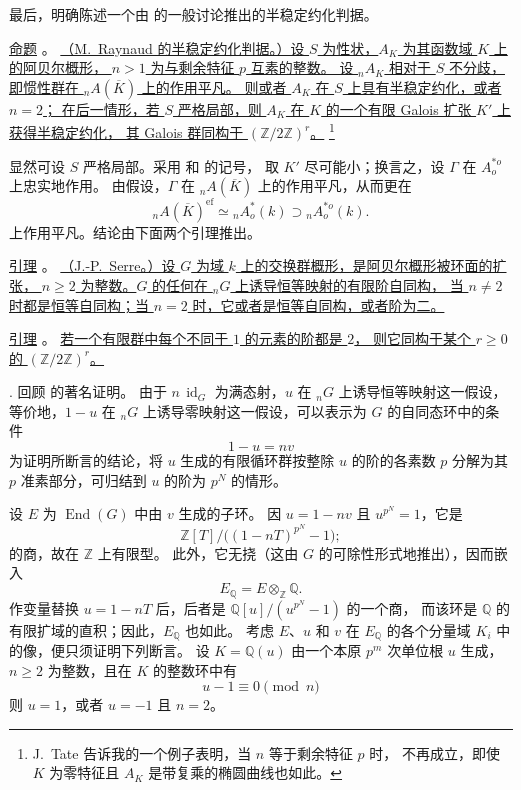 最后，明确陈述一个由  的一般讨论推出的半稳定约化判据。

\medskip
\noindent
\underline{命题} 。
\underline{（M.\ Raynaud 的半稳定约化判据。）设 $S$ 为性状，$A_K$ 为其函数域 $K$ 上的阿贝尔概形，
$n>1$ 为与剩余特征 $p$ 互素的整数。
设 ${}_nA_K$ 相对于 $S$ 不分歧，即惯性群在 ${}_nA(\overline K)$ 上的作用平凡。
则或者 $A_K$ 在 $S$ 上具有半稳定约化，或者 $n=2$；
在后一情形，若 $S$ 严格局部，则 $A_K$ 在 $K$ 的一个有限 Galois 扩张 $K'$ 上获得半稳定约化，
其 Galois 群同构于 $(\mathbb Z/2\mathbb Z)^r$。}
\footnote{J.\ Tate 告诉我的一个例子表明，当 $n$ 等于剩余特征 $p$ 时，
 不再成立，即使 $K$ 为零特征且 $A_K$ 是带复乘的椭圆曲线也如此。}

显然可设 $S$ 严格局部。采用  和  的记号，
取 $K'$ 尽可能小；换言之，设 $\Gamma$ 在 $A^{*o}_o$ 上忠实地作用。
由假设，$\Gamma$ 在 ${}_nA(\overline K)$ 上的作用平凡，从而更在
\[
 {}_nA(\overline K)^{\mathrm{ef}}
 \simeq{}_nA^*_o(k)\supset{}_nA^{*o}_o(k).
\]
上作用平凡。结论由下面两个引理推出。

\medskip
\noindent
\underline{引理} 。
\underline{（J.-P.\ Serre。）设 $G$ 为域 $k$ 上的交换群概形，是阿贝尔概形被环面的扩张，
$n\geq2$ 为整数。$G$ 的任何在 ${}_nG$ 上诱导恒等映射的有限阶自同构，
当 $n\neq2$ 时都是恒等自同构；当 $n=2$ 时，它或者是恒等自同构，或者阶为二。}

\medskip
\noindent
\underline{引理} 。
\underline{若一个有限群中每个不同于 $1$ 的元素的阶都是 $2$，
则它同构于某个 $r\geq0$ 的 $(\mathbb Z/2\mathbb Z)^r$。}

\smallskip
\noindent
{}. 回顾  的著名证明。
由于 $n\,\operatorname{id}_G$ 为满态射，$u$ 在 ${}_nG$ 上诱导恒等映射这一假设，
等价地，$1-u$ 在 ${}_nG$ 上诱导零映射这一假设，可以表示为 $G$ 的自同态环中的条件
\[
 1-u=nv
\]
为证明所断言的结论，将 $u$ 生成的有限循环群按整除 $u$ 的阶的各素数 $p$
分解为其 $p$ 准素部分，可归结到 $u$ 的阶为 $p^N$ 的情形。

设 $E$ 为 $\operatorname{End}(G)$ 中由 $v$ 生成的子环。
因 $u=1-nv$ 且 $u^{p^N}=1$，它是
\[
 \mathbb Z[T]\big/\bigl((1-nT)^{p^N}-1\bigr);
\]
的商，故在 $\mathbb Z$ 上有限型。
此外，它无挠（这由 $G$ 的可除性形式地推出），因而嵌入
\[
 E_{\mathbb Q}=E\otimes_{\mathbb Z}\mathbb Q.
\]
作变量替换 $u=1-nT$ 后，后者是 $\mathbb Q[u]/(u^{p^N}-1)$ 的一个商，
而该环是 $\mathbb Q$ 的有限扩域的直积；因此，$E_{\mathbb Q}$ 也如此。
考虑 $E$、$u$ 和 $v$ 在 $E_{\mathbb Q}$ 的各个分量域 $K_i$ 中的像，便只须证明下列断言。
设 $K=\mathbb Q(u)$ 由一个本原 $p^m$ 次单位根 $u$ 生成，$n\geq2$ 为整数，且在 $K$ 的整数环中有
\[
 u-1\equiv0\pmod n
\]
则 $u=1$，或者 $u=-1$ 且 $n=2$。

